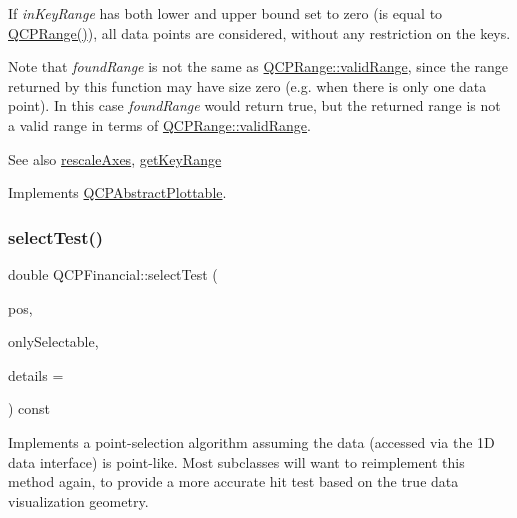 If {\itshape in\+Key\+Range} has both lower and upper bound set to zero (is equal to {\ttfamily \mbox{\hyperlink{class_q_c_p_range}{Q\+C\+P\+Range()}}}), all data points are considered, without any restriction on the keys.

Note that {\itshape found\+Range} is not the same as \mbox{\hyperlink{class_q_c_p_range_ab38bd4841c77c7bb86c9eea0f142dcc0}{Q\+C\+P\+Range\+::valid\+Range}}, since the range returned by this function may have size zero (e.\+g. when there is only one data point). In this case {\itshape found\+Range} would return true, but the returned range is not a valid range in terms of \mbox{\hyperlink{class_q_c_p_range_ab38bd4841c77c7bb86c9eea0f142dcc0}{Q\+C\+P\+Range\+::valid\+Range}}.

\begin{DoxySeeAlso}{See also}
\mbox{\hyperlink{class_q_c_p_abstract_plottable_a1491c4a606bccd2d09e65e11b79eb882}{rescale\+Axes}}, \mbox{\hyperlink{class_q_c_p_financial_a15d68fb257113fef697356d65fa76559}{get\+Key\+Range}} 
\end{DoxySeeAlso}


Implements \mbox{\hyperlink{class_q_c_p_abstract_plottable_a4de773988b21ed090fddd27c6a3a3dcb}{Q\+C\+P\+Abstract\+Plottable}}.

\mbox{\label{class_q_c_p_financial_aac8e91622ac58330fa9ce81cc8fd40ee}} 
\subsubsection{\texorpdfstring{select\+Test()}{selectTest()}}
{\footnotesize\ttfamily double Q\+C\+P\+Financial\+::select\+Test (\begin{DoxyParamCaption}\item[{const Q\+PointF \&}]{pos,  }\item[{bool}]{only\+Selectable,  }\item[{Q\+Variant $\ast$}]{details = {} }\end{DoxyParamCaption}) const\hspace{0.3cm}{\ttfamily [virtual]}}

Implements a point-\/selection algorithm assuming the data (accessed via the 1D data interface) is point-\/like. Most subclasses will want to reimplement this method again, to provide a more accurate hit test based on the true data visualization geometry.

